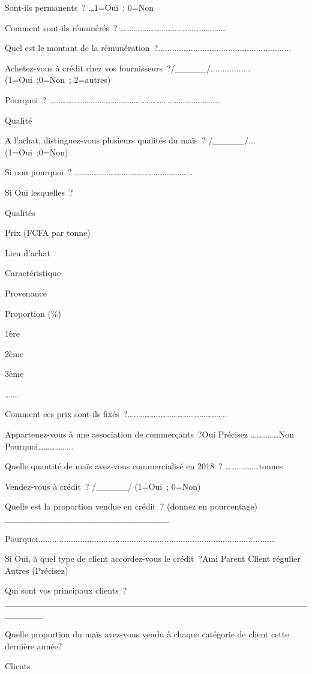 \documentclass[12pt,oneside]{report}
\begin{document}
Sont-ils permanents ? …1=Oui ; 0=Non

Comment sont-ils rémunérés ? ……………………………………..…………

Quel est le montant de la rémunération ?.........................................................

Achetez-vous à crédit chez vos fournisseurs ?/\_\_\_\_\_/.................(1=Oui ;0=Non ; 2=autres)

Pourquoi ? ……………………………………………………………………………….

Qualité

A l’achat, distinguez-vous plusieurs qualités du maïs ? /\_\_\_\_\_/...(1=Oui ;0=Non)

Si non pourquoi ? ………………………………………………………

Si Oui lesquelles ?

Qualités

Prix (FCFA par tonne)

Lieu d’achat

Caractéristique

Provenance

Proportion (\%)

1ère

2ème

3ème

…….

Comment ces prix sont-ils fixés ?……………..……………………………..

Appartenez-vous à une association de commerçants ?Oui  Précisez ……………Non       Pourquoi……………...

Quelle quantité de maïs avez-vous commercialisé en 2018 ? ………………tonnes

Vendez-vous à crédit ? /\_\_\_\_\_/   (1=Oui ; 0=Non)

Quelle est la proportion vendue en crédit ? (donnez en pourcentage) \_\_\_\_\_\_\_\_\_\_\_\_\_\_\_\_\_\_\_\_\_\_\_\_\_\_

Pourquoi......................................................................................................

Si Oui, à quel type de client accordez-vous le crédit ?Ami        Parent    Client régulier         Autres (Précisez)

Qui sont vos principaux clients ? \_\_\_\_\_\_\_\_\_\_\_\_\_\_\_\_\_\_\_\_\_\_\_\_\_\_\_\_\_\_\_\_\_\_\_\_\_\_\_\_\_\_\_\_\_\_\_\_\_\_\_\_\_\_

Quelle proportion du maïs avez-vous vendu à chaque catégorie de client cette dernière année?

Clients
\end{document}
